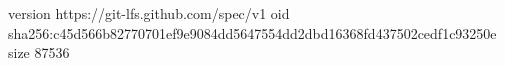 version https://git-lfs.github.com/spec/v1
oid sha256:c45d566b82770701ef9e9084dd5647554dd2dbd16368fd437502cedf1c93250e
size 87536
